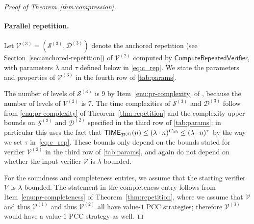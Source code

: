 \documentclass[11pt]{article}
\theoremstyle{definition}
\newcommand{\sampler}{\mathcal{S}}
\newcommand{\decider}{\mathcal{D}}
\newcommand{\verifier}{\mathcal{V}}
\newcommand{\gamestyle}[1]{\ensuremath{\textsc{#1}}\xspace}
\newcommand{\ar}{\gamestyle{AR}}
\newcommand{\TIME}{\mathsf{TIME}}
\newcommand{\tmstyle}[1]{\ensuremath{\mathsf{#1}}}
\newcommand{\ComputeParrepVerifier}{\tmstyle{ComputeRepeatedVerifier}}
\begin{document}
\begin{proof}[Proof of Theorem~\ref{thm:compression}]
  \paragraph{Parallel repetition.}
  Let $\verifier^{(3)} = (\sampler^{(3)},\decider^{(3)})$ denote the anchored
  repetition (see Section~\ref{sec:anchored-repetition}) of $\verifier^{(2)}$
  computed by $\ComputeParrepVerifier$, with parameters $\lambda$ and $\tau$ defined below in \cref{eq:c_rep}. 
  We state the parameters and properties of $\verifier^{(3)}$ in the fourth row
  of \cref{tab:params}. 
  
  The number of levels of $\sampler^{(3)}$ is $9$ by Item~\ref{enu:pr-complexity} of , because the number of levels of $\verifier^{(2)}$ is $7$. The time complexities of $\sampler^{(3)}$ and $\decider^{(3)}$ follow from
  \cref{enu:pr-complexity} of Theorem~\ref{thm:repetition} and the
  complexity upper bounds on $\sampler^{(2)}$ and $\decider^{(2)}$ specified in
  the third row of \cref{tab:params}; in particular this uses the fact that $\TIME_{\decider^{(2)}}(n) \leq (\lambda \cdot n)^{C_\ar} \leq (\lambda \cdot n)^{\tau}$ by the way we set $\tau$ in~\cref{eq:c_rep}. 
  These bounds only depend on the bounds stated for verifier $\verifier^{(2)}$
  in the third row of \cref{tab:params}, and again do not depend on whether the
  input verifier $\verifier$ is $\lambda$-bounded.

  For the soundness and completeness entries, we assume that the starting verifier $\verifier$ is $\lambda$-bounded. The statement in the completeness entry follows from
  Item~\ref{enu:pr-completeness} of Theorem~\ref{thm:repetition}, where we assume that $\verifier$ and thus $\verifier^{(1)}$ and thus $\verifier^{(2)}$ all have value-$1$ PCC strategies; therefore $\verifier^{(3)}$ would have a value-$1$ PCC strategy as well.
  

\end{proof}
\end{document}
